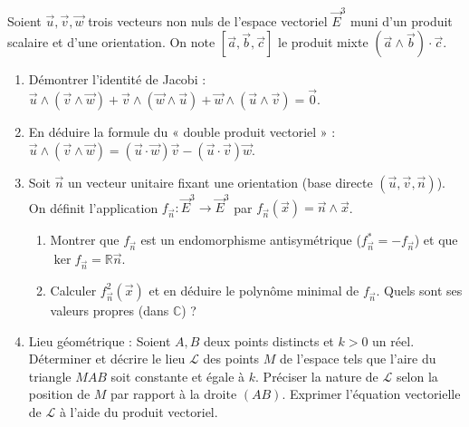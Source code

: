 \documentclass[11pt]{article}
\begin{document}
\begin{exercice}
Soient $\vec{u},\vec{v},\vec{w}$ trois vecteurs non nuls de l'espace vectoriel $\vec{E}^3$ muni d'un produit scalaire et d'une orientation. On note $[\vec{a},\vec{b},\vec{c}]$ le produit mixte $(\vec{a}\wedge\vec{b})\cdot\vec{c}$.
\begin{enumerate}
    \item Démontrer l'identité de Jacobi : $\vec{u}\wedge(\vec{v}\wedge\vec{w})+\vec{v}\wedge(\vec{w}\wedge\vec{u})+\vec{w}\wedge(\vec{u}\wedge\vec{v})=\vec{0}$.
    \item En déduire la formule du « double produit vectoriel » : $\vec{u}\wedge(\vec{v}\wedge\vec{w})=(\vec{u}\cdot\vec{w})\vec{v}-(\vec{u}\cdot\vec{v})\vec{w}$.
    \item Soit $\vec{n}$ un vecteur unitaire fixant une orientation (base directe $(\vec{u},\vec{v},\vec{n})$). On définit l'application $f_{\vec{n}} : \vec{E}^3 \to \vec{E}^3$ par $f_{\vec{n}}(\vec{x}) = \vec{n}\wedge\vec{x}$.
    \begin{enumerate}
        \item Montrer que $f_{\vec{n}}$ est un endomorphisme antisymétrique ($f_{\vec{n}}^* = -f_{\vec{n}}$) et que $\ker f_{\vec{n}} = \mathbb{R}\vec{n}$.
        \item Calculer $f_{\vec{n}}^2(\vec{x})$ et en déduire le polynôme minimal de $f_{\vec{n}}$. Quels sont ses valeurs propres (dans $\mathbb{C}$) ?
    \end{enumerate}
    \item Lieu géométrique : Soient $A,B$ deux points distincts et $k>0$ un réel. Déterminer et décrire le lieu $\mathcal{L}$ des points $M$ de l'espace tels que l'aire du triangle $MAB$ soit constante et égale à $k$. Préciser la nature de $\mathcal{L}$ selon la position de $M$ par rapport à la droite $(AB)$. Exprimer l'équation vectorielle de $\mathcal{L}$ à l'aide du produit vectoriel.
\end{enumerate}
\end{exercice}
\end{document}
